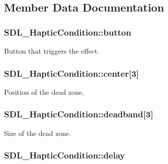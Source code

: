 \subsection{Member Data Documentation}
\hypertarget{struct_s_d_l___haptic_condition_acd35a9d432ad122bf7824b16974eac7a}{
\subsubsection[{button}]{ S\-D\-L\-\_\-\-Haptic\-Condition\-::button}}\label{struct_s_d_l___haptic_condition_acd35a9d432ad122bf7824b16974eac7a}
Button that triggers the effect. \hypertarget{struct_s_d_l___haptic_condition_a8a71ec28ff5ab85246cbc59736aa2c53}{
\subsubsection[{center}]{ S\-D\-L\-\_\-\-Haptic\-Condition\-::center\mbox{[}3\mbox{]}}}\label{struct_s_d_l___haptic_condition_a8a71ec28ff5ab85246cbc59736aa2c53}
Position of the dead zone. \hypertarget{struct_s_d_l___haptic_condition_af684c8eeeb719739a32723c00c5a2bbd}{
\subsubsection[{deadband}]{ S\-D\-L\-\_\-\-Haptic\-Condition\-::deadband\mbox{[}3\mbox{]}}}\label{struct_s_d_l___haptic_condition_af684c8eeeb719739a32723c00c5a2bbd}
Size of the dead zone. \hypertarget{struct_s_d_l___haptic_condition_aad40417980530ca8d80c62ba864a090b}{
\subsubsection[{delay}]{ S\-D\-L\-\_\-\-Haptic\-Condition\-::delay}}\label{struct_s_d_l___haptic_condition_aad40417980530ca8d80c62ba864a090b}
